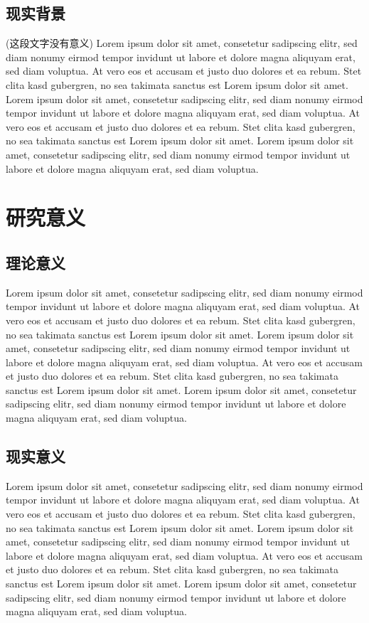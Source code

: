 \documentclass[]{WTUthesis}
\begin{document}
	\subsection{现实背景}
	
	(这段文字没有意义) Lorem ipsum dolor sit amet, consetetur sadipscing elitr, sed diam nonumy eirmod tempor invidunt ut labore et dolore magna aliquyam erat, sed diam voluptua. At vero eos et accusam et justo duo dolores et ea rebum. Stet clita kasd gubergren, no sea takimata sanctus est Lorem ipsum dolor sit amet. Lorem ipsum dolor sit amet, consetetur sadipscing elitr, sed diam nonumy eirmod tempor invidunt ut labore et dolore magna aliquyam erat, sed diam voluptua. At vero eos et accusam et justo duo dolores et ea rebum. Stet clita kasd gubergren, no sea takimata sanctus est Lorem ipsum dolor sit amet. Lorem ipsum dolor sit amet, consetetur sadipscing elitr, sed diam nonumy eirmod tempor invidunt ut labore et dolore magna aliquyam erat, sed diam voluptua.
	
	\newpage
	
	\section{研究意义}
	
	\subsection{理论意义}
	
	Lorem ipsum dolor sit amet, consetetur sadipscing elitr, sed diam nonumy eirmod tempor invidunt ut labore et dolore magna aliquyam erat, sed diam voluptua. At vero eos et accusam et justo duo dolores et ea rebum. Stet clita kasd gubergren, no sea takimata sanctus est Lorem ipsum dolor sit amet. Lorem ipsum dolor sit amet, consetetur sadipscing elitr, sed diam nonumy eirmod tempor invidunt ut labore et dolore magna aliquyam erat, sed diam voluptua. At vero eos et accusam et justo duo dolores et ea rebum. Stet clita kasd gubergren, no sea takimata sanctus est Lorem ipsum dolor sit amet. Lorem ipsum dolor sit amet, consetetur sadipscing elitr, sed diam nonumy eirmod tempor invidunt ut labore et dolore magna aliquyam erat, sed diam voluptua.
	
	\subsection{现实意义}
	
	Lorem ipsum dolor sit amet, consetetur sadipscing elitr, sed diam nonumy eirmod tempor invidunt ut labore et dolore magna aliquyam erat, sed diam voluptua. At vero eos et accusam et justo duo dolores et ea rebum. Stet clita kasd gubergren, no sea takimata sanctus est Lorem ipsum dolor sit amet. Lorem ipsum dolor sit amet, consetetur sadipscing elitr, sed diam nonumy eirmod tempor invidunt ut labore et dolore magna aliquyam erat, sed diam voluptua. At vero eos et accusam et justo duo dolores et ea rebum. Stet clita kasd gubergren, no sea takimata sanctus est Lorem ipsum dolor sit amet. Lorem ipsum dolor sit amet, consetetur sadipscing elitr, sed diam nonumy eirmod tempor invidunt ut labore et dolore magna aliquyam erat, sed diam voluptua.
	
\end{document}
